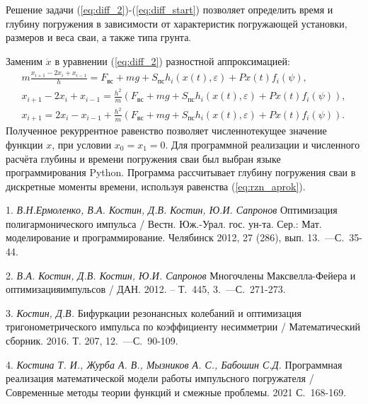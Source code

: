 Решение задачи (\ref{eq:diff_2})-(\ref{eq:diff_start}) позволяет определить время и глубину погружения в зависимости от характеристик погружающей установки, размеров и веса сваи, а также типа грунта.

Заменим $\ddot{x}$ в уравнении (\ref{eq:diff_2}) разностной аппроксимацией:
\begin{equation}\label{eq:rzn_aprok}
    \begin{gathered}
        m \frac{x_{i+1}\!-\!2x_i\!+\!x_{i-1}}{h}\! = \!F_{\textrm{вс}}\!+\!mg\!+\!S_{\textrm{пс}}h_i(x(t),\varepsilon)\!+\!Px(t)f_i(\psi), \\
        x_{i+1} - 2x_i + x_{i-1}\! = \!\frac{h^2}{m}(F_{\textrm{вс}}\!+\!mg\!+\!S_{\textrm{пс}}h_i(x(t),\varepsilon)\!+\!Px(t)f_i(\psi)), \\
        x_{i+1}\! = \!2x_i\!-\!x_{i-1}\!+\!\frac{h^2}{m}(F_{\textrm{вс}}\!+\!mg\!+\!S_{\textrm{пс}}h_i(x(t),\varepsilon)\!+\!Px(t)f_i(\psi)).
    \end{gathered}
\end{equation}
Полученное рекуррентное равенство позволяет численно текущее значение функции $x$, при условии $x_0 = x_1 = 0$.
Для программной реализации и численного расчёта глубины и времени погружения сваи был выбран языке программирования Python. Программа рассчитывает глубину погружения сваи в дискретные моменты времени, используя равенства (\ref{eq:rzn_aprok}).


\litlist

1. {\it В.Н.Ермоленко, В.А. Костин, Д.В. Костин, Ю.И. Сапронов}
Оптимизация полигармонического импульса / Вестн. Юж.-Урал. гос. ун-та. Сер.: Мат. моделирование и программирование. Челябинск 2012, 27 (286), вып. 13.~---С.~35-44.

2. {\it В.А. Костин, Д.В. Костин, Ю.И. Сапронов}
Многочлены Максвелла-Фейера и оптимизация импульсов / ДАН. 2012. -- Т.~445, 3.~---С.~271-273.

3. {\it Костин, Д.В.}
Бифуркации резонансных колебаний и оптимизация тригонометрического импульса по коэффициенту несимметрии / Математический сборник. 2016. Т. 207, 12.~---С.~90-109.

4. {\it Костина Т. И., Журба А. В., Мызников А. С., Бабошин С.Д.}
Программная реализация математической модели работы импульсного погружателя / Современные методы теории функций и смежные проблемы. 2021 С.~168-169.
